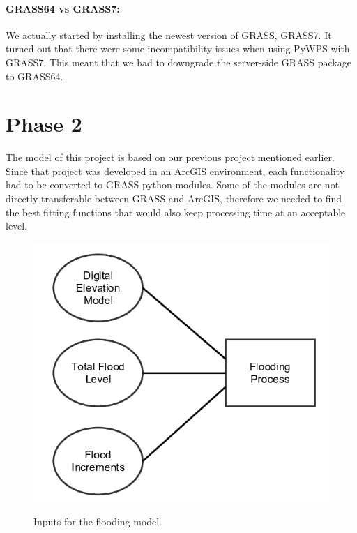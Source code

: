 \paragraph{GRASS64 vs GRASS7:} We actually started by installing the newest version of GRASS, GRASS7. It turned out that there were some  incompatibility issues when using PyWPS with GRASS7. This meant that we had to downgrade the server-side GRASS package to GRASS64.\\

\section{Phase 2}
The model of this project is based on our previous project mentioned earlier. Since that project was developed in an ArcGIS environment, each functionality had to be converted to GRASS python modules. Some of the modules are not directly transferable between GRASS and ArcGIS, therefore we needed to find the best fitting functions that would also keep processing time at an acceptable level.\\

\begin{figure}[h!]
\centering
	{\includegraphics[width=.45\linewidth]{gfx/Phase_2/image.png}}
\caption{Inputs for the flooding model.}
\label{fig:inputs}
\end{figure}\\

